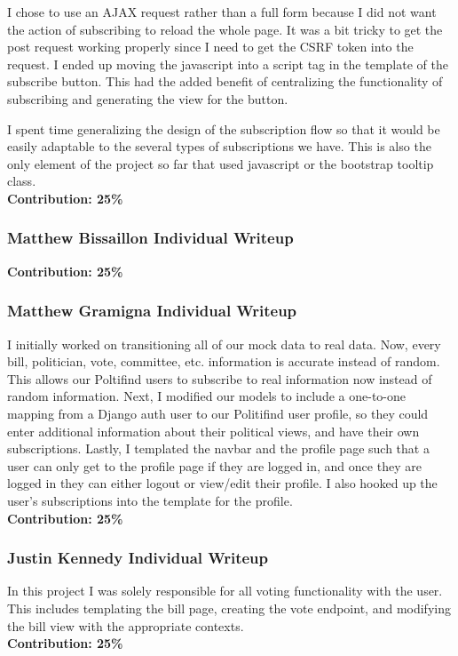 \documentclass{article}
\newcommand{\n}{\noindent}
\begin{document}
I chose to use an AJAX request rather than a full form because I did not want the action of 
subscribing to reload the whole page.   It was a bit tricky to get the post request working properly since I need to get the CSRF token into 
the request.  I ended up moving the javascript into a script tag in the template of the subscribe button.  This had the added benefit of centralizing
the functionality of subscribing and generating the view for the button. 

I spent time generalizing the design of the subscription flow so that it would be easily adaptable to the several types of
subscriptions we have.  This is also the only element of the project so far that used javascript or the bootstrap tooltip class. \\


\n\textbf{Contribution: 25\%}

\pagebreak

\subsubsection*{Matthew Bissaillon Individual Writeup}

\n\textbf{Contribution: 25\%}
\pagebreak

\subsubsection*{Matthew Gramigna Individual Writeup}

I initially worked on transitioning all of our mock data to real data. Now, every bill, politician, vote, committee, etc. information is accurate instead of random. This allows our Poltifind users to subscribe to real information now instead of random information. Next, I modified our models to include a one-to-one mapping from a Django auth user to our Politifind user profile, so they could enter additional information about their political views, and have their own subscriptions. Lastly, I templated the navbar and the profile page such that a user can only get to the profile page if they are logged in, and once they are logged in they can either logout or view/edit their profile. I also hooked up the user's subscriptions into the template for the profile.\\

\n\textbf{Contribution: 25\%}

\pagebreak

\subsubsection*{Justin Kennedy Individual Writeup}

In this project I was solely responsible for all voting functionality with the user.  This includes templating the bill page, creating the vote endpoint, and modifying the bill view with the appropriate contexts.\\

\n\textbf{Contribution: 25\%}
\end{document}
